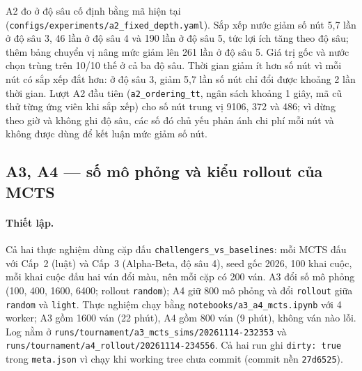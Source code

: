 
A2 đo ở độ sâu cố định bằng mã hiện tại (\texttt{configs/experiments/a2\_fixed\_depth.yaml}). Sắp xếp nước giảm số nút 5{,}7 lần ở độ sâu 3, 46 lần ở độ sâu 4 và 190 lần ở độ sâu 5, tức lợi ích tăng theo độ sâu; thêm bảng chuyển vị nâng mức giảm lên 261 lần ở độ sâu 5. Giá trị gốc và nước chọn trùng trên 10/10 thế ở cả ba độ sâu. Thời gian giảm ít hơn số nút vì mỗi nút có sắp xếp đắt hơn: ở độ sâu 3, giảm 5{,}7 lần số nút chỉ đổi được khoảng 2 lần thời gian. Lượt A2 đầu tiên (\texttt{a2\_ordering\_tt}, ngân sách khoảng 1 giây, mã cũ thử từng ứng viên khi sắp xếp) cho số nút trung vị \num{9106}, 372 và 486; vì dừng theo giờ và không ghi độ sâu, các số đó chủ yếu phản ánh chi phí mỗi nút và không được dùng để kết luận mức giảm số nút.

\subsection{A3, A4 --- số mô phỏng và kiểu rollout của MCTS}
\paragraph{Thiết lập.}
Cả hai thực nghiệm dùng cặp đấu \texttt{challengers\_vs\_baselines}: mỗi MCTS đấu với Cấp~2 (luật) và Cấp~3 (Alpha-Beta, độ sâu 4), seed gốc 2026, 100 khai cuộc, mỗi khai cuộc đấu hai ván đổi màu, nên mỗi cặp có 200 ván. A3 đổi số mô phỏng (100, 400, 1600, 6400; rollout \texttt{random}); A4 giữ 800 mô phỏng và đổi \texttt{rollout} giữa \texttt{random} và \texttt{light}. Thực nghiệm chạy bằng \texttt{notebooks/a3\_a4\_mcts.ipynb} với 4 worker; A3 gồm 1600 ván (22 phút), A4 gồm 800 ván (9 phút), không ván nào lỗi. Log nằm ở \texttt{runs/tournament/a3\_mcts\_sims/20261114-232353} và \texttt{runs/tournament/a4\_rollout/20261114-234556}. Cả hai run ghi \texttt{dirty: true} trong \texttt{meta.json} vì chạy khi working tree chưa commit (commit nền \texttt{27d6525}).

